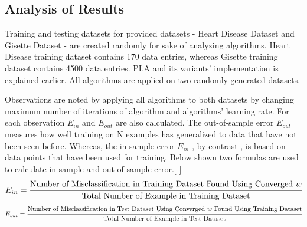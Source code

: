 \documentclass{article}
\begin{document}
\subsection{Analysis of Results}
Training and testing datasets for provided datasets - Heart Disease Dataset and Gisette Dataset - are created randomly for sake of analyzing algorithms. Heart Disease training dataset contains 170 data entries, whereas Gisette training dataset contains 4500 data entries. PLA and its variants' implementation is explained earlier. All algorithms are applied on two randomly generated datasets.
\par Observations are noted by applying all algorithms to both datasets by changing maximum number of iterations of algorithm and algorithms' learning rate. For each observation \(E_{in}\) and \(E_{out}\) are also calculated. The out-of-sample error \(E_{out}\) measures how well training on N examples has generalized to data that have not been seen before. Whereas, the in-sample error \(E_{in}\)  , by contrast , is based on data points that have been used for training. Below shown two formulas are used to calculate in-sample and out-of-sample error.[ \cite{Book1} ]
\begin{equation} 
E_{in} = \cfrac{\text{Number of Misclassification in Training Dataset Found Using Converged \(w\)}}{\text{Total Number of Example in Training Dataset}}\\
\end{equation}
\begin{equation} 
E_{out} = \cfrac{\text{Number of Misclassification in Test Dataset Using Converged \(w\) Found Using Training Dataset}}{\text{Total Number of Example in Test Dataset}}\\
\end{equation}
\end{document}
